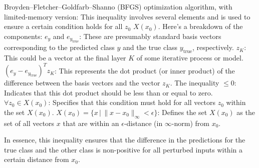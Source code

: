Broyden–Fletcher–Goldfarb–Shanno (BFGS) optimization algorithm, with limited-memory version: 
This inequality involves several elements and is used to ensure a certain condition holds for all  $z_0$  $X(x_0)$. Here's a breakdown of the components:
$e_y$ and $e_{y_{\text{true}}}$: These are presumably standard basis vectors corresponding to the predicted class $y$ and the true class $y_{\text{true}}$, respectively.
$z_K$: This could be a vector at the final layer $K$ of some iterative process or model.
$(e_y - e_{y_{\text{true}}})^T z_K$: This represents the dot product (or inner product) of the difference between the basis vectors and the vector $z_K$.
The inequality $\leq 0$: Indicates that this dot product should be less than or equal to zero.
$\forall z_0 \in X(x_0)$: Specifies that this condition must hold for all vectors $z_0$ within the set $X(x_0)$.
$X(x_0) = \{x \,|\, \|x - x_0\|_{\infty} < \epsilon\}$: Defines the set $X(x_0)$ as the set of all vectors $x$ that are within an $\epsilon$-distance (in $\infty$-norm) from $x_0$.

In essence, this inequality ensures that the difference in the predictions for the true class and the other class is non-positive for all perturbed inputs within a certain distance from $x_0$.